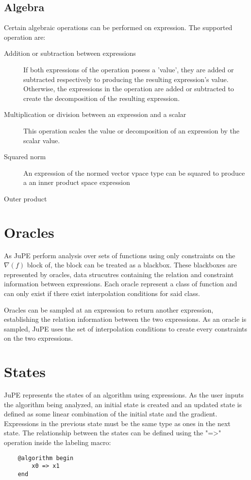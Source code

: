 \subsection*{Algebra}
Certain algebraic operations can be performed on expression. The supported operation are:
\begin{description}
	\item[Addition or subtraction between expressions] If both expressions of the operation posess a 'value', they are added or subtracted respectively to producing the resulting expression's value. Otherwise, the expressions in the operation are added or subtracted to create the decomposition of the resulting expression.
	\item[Multiplication or division between an expression and a scalar] This operation scales the value or decomposition of an expression by the scalar value.
	\item[Squared norm] An expression of the normed vector vpace type can be squared to produce a an inner product space expression 
	\item[Outer product]
\end{description}

\section{Oracles}
As JuPE perform analysis over sets of functions using only constraints on the \( \nabla (f) \) block of, the block can be treated as a blackbox. These blackboxes are represented by oracles, data strucutres containing the relation and constraint information between expressions. Each oracle represent a class of function and can only exist if there exist interpolation conditions for said class.

Oracles can be sampled at an expression to return another expression, establishing the relation information between the two expressions. As an oracle is sampled, JuPE uses the set of interpolation conditions to create every constraints on the two expressions.

\section{States}
JuPE represents the states of an algorithm using expressions. As the user inputs the algorithm being analyzed, an initial state is created and an updated state is defined as some linear combination of the initial state and the gradient. Expressions in the previous state must be the same type as ones in the next state. The relationship between the states can be defined using the "=>" operation inside the labeling macro:
\begin{lstlisting}
	@algorithm begin
		x0 => x1
	end
\end{lstlisting}

